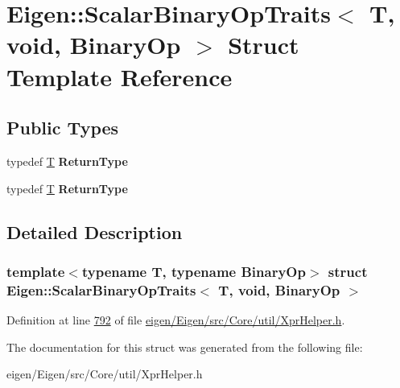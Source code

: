 \hypertarget{struct_eigen_1_1_scalar_binary_op_traits_3_01_t_00_01void_00_01_binary_op_01_4}{}\section{Eigen\+:\+:Scalar\+Binary\+Op\+Traits$<$ T, void, Binary\+Op $>$ Struct Template Reference}
\label{struct_eigen_1_1_scalar_binary_op_traits_3_01_t_00_01void_00_01_binary_op_01_4}
\subsection*{Public Types}
\begin{DoxyCompactItemize}
\item 
\mbox{\label{struct_eigen_1_1_scalar_binary_op_traits_3_01_t_00_01void_00_01_binary_op_01_4_ab0051f4547c36694de736a63b33c7ff4}} 
typedef \hyperlink{group___sparse_core___module}{T} {\bfseries Return\+Type}
\item 
\mbox{\label{struct_eigen_1_1_scalar_binary_op_traits_3_01_t_00_01void_00_01_binary_op_01_4_ab0051f4547c36694de736a63b33c7ff4}} 
typedef \hyperlink{group___sparse_core___module}{T} {\bfseries Return\+Type}
\end{DoxyCompactItemize}


\subsection{Detailed Description}
\subsubsection*{template$<$typename T, typename Binary\+Op$>$\newline
struct Eigen\+::\+Scalar\+Binary\+Op\+Traits$<$ T, void, Binary\+Op $>$}



Definition at line \hyperlink{eigen_2_eigen_2src_2_core_2util_2_xpr_helper_8h_source_l00792}{792} of file \hyperlink{eigen_2_eigen_2src_2_core_2util_2_xpr_helper_8h_source}{eigen/\+Eigen/src/\+Core/util/\+Xpr\+Helper.\+h}.



The documentation for this struct was generated from the following file\+:\begin{DoxyCompactItemize}
\item 
eigen/\+Eigen/src/\+Core/util/\+Xpr\+Helper.\+h\end{DoxyCompactItemize}

